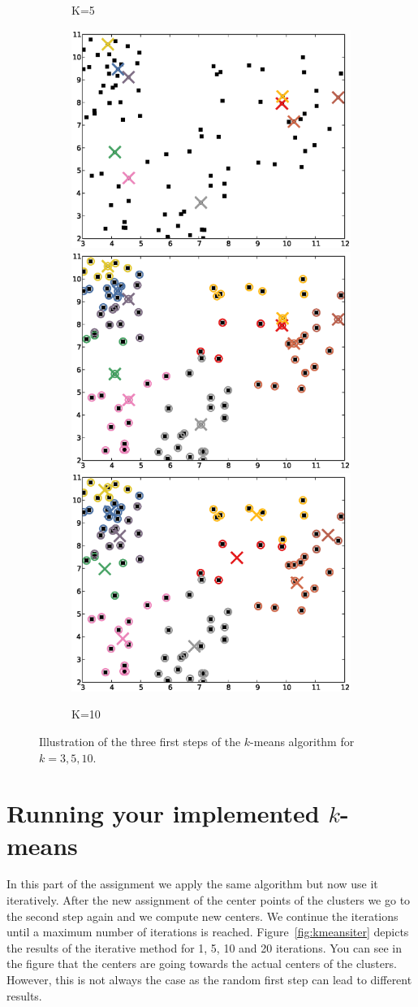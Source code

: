 \documentclass[a4paper,10pt,twoside]{article}
\begin{document}
\begin{figure}
\begin{subfigure}{1.00\textwidth}
    \caption{K=5}
  \end{subfigure}
  \begin{subfigure}{1.00\textwidth}
    \centering
    \includegraphics[width=.32\textwidth,height=.3\textheight,keepaspectratio]{figure_7.eps}
    \includegraphics[width=.32\textwidth,height=.3\textheight,keepaspectratio]{figure_8.eps}
    \includegraphics[width=.32\textwidth,height=.3\textheight,keepaspectratio]{figure_9.eps}
    \caption{K=10}
  \end{subfigure}
  \caption{Illustration of the three first steps of the $k$-means algorithm for $k=3,5,10$.}
  \label{fig:kmeanssimple}
\end{figure}

\section{Running your implemented $k$-means}
In this part of the assignment we apply the same algorithm but now use it iteratively. After the new assignment of the center points of the clusters we go to the second step again and we compute new centers. We continue the iterations until a maximum number of iterations is reached. Figure~\ref{fig:kmeansiter} depicts the results of the iterative method for 1, 5, 10 and 20 iterations.  You can see in the figure that the centers are going towards the actual centers of the clusters. However, this is not always the case as the random first step can lead to different results.
\end{document}
